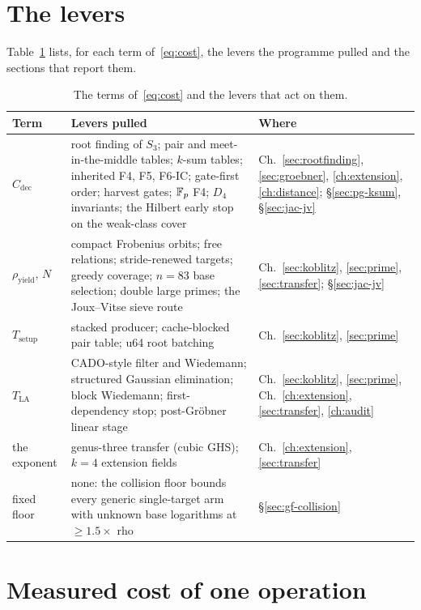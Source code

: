 \section{The levers}

Table~\ref{tab:levers} lists, for each term of~\eqref{eq:cost}, the levers
the programme pulled and the sections that report them.

\begin{table}[t]
\centering\small
\begin{tabularx}{\linewidth}{@{}l>{\raggedright}X>{\raggedright\arraybackslash}p{3.0cm}@{}}
\toprule
Term & Levers pulled & Where \\
\midrule
$C_{\mathrm{dec}}$ & root finding of $S_3$; pair and meet-in-the-middle
  tables; $k$-sum tables; inherited F4, F5, F6-IC; gate-first order;
  harvest gates; $\mathbb{F}_p$ F4; $D_4$ invariants; the Hilbert early stop on
  the weak-class cover & Ch.~\ref{sec:rootfinding}, \ref{sec:groebner},
  \ref{ch:extension}, \ref{ch:distance}; \S\ref{sec:pg-ksum}, \S\ref{sec:jac-jv} \\
$\rho_{\mathrm{yield}}$, $N$ & compact Frobenius orbits; free relations;
  stride-renewed targets; greedy coverage; $n=83$ base selection; double
  large primes; the Joux--Vitse sieve route & Ch.~\ref{sec:koblitz}, \ref{sec:prime}, \ref{sec:transfer}; \S\ref{sec:jac-jv} \\
$T_{\mathrm{setup}}$ & stacked producer; cache-blocked pair table; u64 root
  batching & Ch.~\ref{sec:koblitz}, \ref{sec:prime} \\
$T_{\mathrm{LA}}$ & CADO-style filter and Wiedemann; structured Gaussian
  elimination; block Wiedemann; first-dependency stop; post-Gröbner
  linear stage & Ch.~\ref{sec:koblitz}, \ref{sec:prime},
  Ch.~\ref{ch:extension}, \ref{sec:transfer}, \ref{ch:audit} \\
the exponent & genus-three transfer (cubic GHS); $k=4$ extension fields &
  Ch.~\ref{ch:extension}, \ref{sec:transfer} \\
fixed floor & none: the collision floor bounds every generic
  single-target arm with unknown base logarithms at $\ge1.5\times$ rho & \S\ref{sec:gf-collision} \\
\bottomrule
\end{tabularx}
\caption[]{The terms of~\eqref{eq:cost} and the levers that act on them.}
\label{tab:levers}
\end{table}

\section{Measured cost of one operation}\label{sec:model-opcost}

